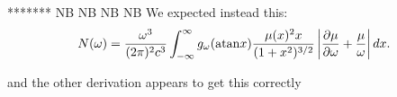 \documentclass[]{article}
\begin{document}
*******
NB NB NB NB We expected instead this:
\begin{equation}\label{N_IBP}
N(\omega) = \frac{\omega^3}{(2\pi)^2 c^3} \int_{-\infty}^\infty g_\omega( \mathrm{atan} x ) 
 \frac{\mu(x)^2 x}{(1+x^2)^{3/2}}
 \left| \frac{\partial \mu}{\partial \omega} + \frac {\mu}{\omega}\right|
 d x .
\end{equation}

and the other derivation appears to get this correctly



\end{document}
